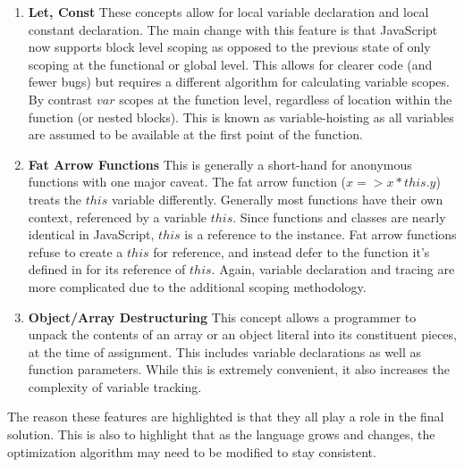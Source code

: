   \begin{enumerate}
    \item \textbf{Let, Const} These concepts allow for local variable declaration and local constant declaration.  The main change with this feature is that JavaScript now supports block level scoping as opposed to the previous state of only scoping at the functional or global level.  This allows for clearer code (and fewer bugs) but requires a different algorithm for calculating variable scopes.  By contrast $var$ scopes at the function level, regardless of location within the function (or nested blocks).  This is known as variable-hoisting as all variables are assumed to be available at the first point of the function.
    \item \textbf{Fat Arrow Functions} This is generally a short-hand for anonymous functions with one major caveat.  The fat arrow function ($x => x * this.y$) treats the $this$ variable differently.  Generally most functions have their own context, referenced by a variable $this$.  Since functions and classes are nearly identical in JavaScript, $this$ is a reference to the instance.  Fat arrow functions refuse to create a $this$ for reference, and instead defer to the function it's defined in for its reference of $this$. Again, variable declaration and tracing are more complicated due to the additional scoping methodology.
    \item \textbf{Object/Array Destructuring}  This concept allows a programmer to unpack the contents of an array or an object literal into its constituent pieces, at the time of assignment.  This includes variable declarations as well as function parameters.  While this is extremely convenient, it also increases the complexity of variable tracking.  
  \end{enumerate}

The reason these features are highlighted is that they all play a role in the final solution.  This is also to highlight that as the language grows and changes, the optimization algorithm may need to be modified to stay consistent. 